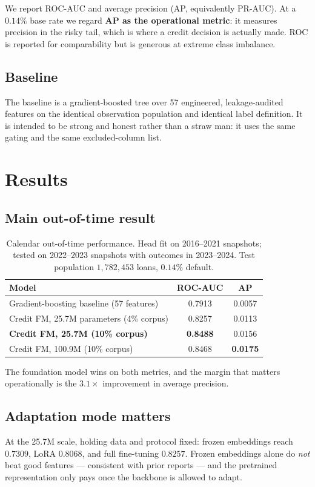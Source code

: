 \documentclass[10pt,letterpaper]{article}
\begin{document}
We report ROC-AUC and average precision (AP, equivalently PR-AUC). At a $0.14\%$ base rate we
regard \textbf{AP as the operational metric}: it measures precision in the risky tail, which is
where a credit decision is actually made. ROC is reported for comparability but is generous at
extreme class imbalance.

\subsection{Baseline}
The baseline is a gradient-boosted tree over 57 engineered, leakage-audited features on the
identical observation population and identical label definition. It is intended to be strong and
honest rather than a straw man: it uses the same gating and the same excluded-column list.

\section{Results}
\label{sec:results}

\subsection{Main out-of-time result}
\begin{table}[h]
\centering
\begin{tabular}{lcc}
\toprule
\textbf{Model} & \textbf{ROC-AUC} & \textbf{AP} \\
\midrule
Gradient-boosting baseline (57 features)      & 0.7913 & 0.0057 \\
Credit FM, 25.7M parameters (4\% corpus)      & 0.8257 & 0.0113 \\
\textbf{Credit FM, 25.7M (10\% corpus)}       & \textbf{0.8488} & 0.0156 \\
Credit FM, 100.9M (10\% corpus)               & 0.8468 & \textbf{0.0175} \\
\bottomrule
\end{tabular}
\caption{Calendar out-of-time performance. Head fit on 2016--2021 snapshots; tested on 2022--2023
snapshots with outcomes in 2023--2024. Test population $1{,}782{,}453$ loans, $0.14\%$ default.}
\label{tab:main}
\end{table}

The foundation model wins on both metrics, and the margin that matters operationally is the
$3.1\times$ improvement in average precision.

\subsection{Adaptation mode matters}
At the 25.7M scale, holding data and protocol fixed: frozen embeddings reach $0.7309$, LoRA
$0.8068$, and full fine-tuning $0.8257$. Frozen embeddings alone do \emph{not} beat good features
--- consistent with prior reports --- and the pretrained representation only pays once the backbone
is allowed to adapt.
\end{document}
